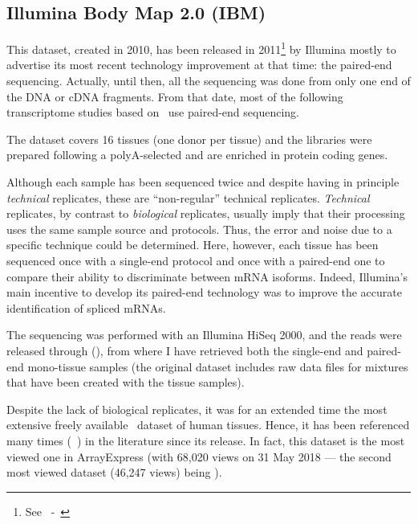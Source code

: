\subsection{Illumina Body Map 2.0 (IBM)}\label{subsec:ibmpresentation}
\vspace*{-0.2in}
This dataset, created in 2010, has been released in
2011\footnote{See~ -~\cite{ibmEnsembl}} by Illumina
mostly to advertise its most recent technology improvement at that time:
the paired-end sequencing. Actually, until then, all the sequencing was done
from only one end of the \gls{DNA} or \gls{cDNA} fragments. From that
date, most of the following transcriptome studies based on \Rnaseq\ use
paired-end sequencing.

The dataset covers 16 tissues (one donor per tissue) and
the libraries were prepared following a polyA-selected
and are enriched in protein coding genes.

Although each sample has been sequenced twice and despite having in principle
\emph{technical} replicates, these are ``non-regular'' technical replicates.
\emph{Technical} replicates, by contrast to \emph{biological} replicates,
usually imply that their processing uses the same sample source and protocols.
Thus, the error and noise due to a specific technique could be determined.
Here, however, each tissue has been sequenced once with a single-end protocol
and once with a paired-end one to compare their ability to discriminate between
\gls{mRNA} isoforms.
Indeed, Illumina's main incentive to develop its paired-end
technology was to improve the accurate identification of spliced \glspl{mRNA}.

The sequencing was performed with an Illumina HiSeq 2000, and the reads were
released through  (),
from where I have retrieved both the single-end and paired-end mono-tissue samples
(the original dataset includes raw data files for mixtures
that have been created with the tissue samples).

Despite the lack of biological replicates,
it was for an extended time
the most extensive freely available \Rnaseq\ dataset of human tissues.
Hence, it has been referenced many times
(\eg\ \citet{Asmann2012-in,ibmrelatedpaper,Smith2012-jw,Derrien2012-ej,%
Florea2013-in,tophat2,Kechavarzi2014-oi,Zhao2014-xj,Pasquali2014-zj,Corpas2014-ej,%
Petryszak2014-kj,Brown2015-co,Janes2015-wn,%
De_Simone2016-fb,Kern2016-dv,Iwakiri2016-sr,Yao2017-gj,Akers2018-cf})
in the literature since its release.
In fact, this dataset is the most viewed one in \gls{ArrayExpress}
(with 68,020 views on 31 May 2018 ---
the second most viewed dataset (46,247 views)
being ).

